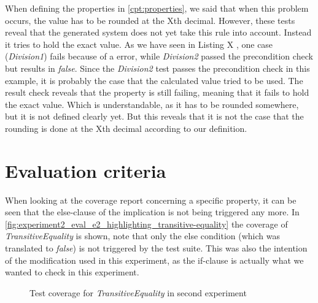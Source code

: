 When defining the properties in \autoref{cpt:properties}, we said that when this problem occurs, the value has to be rounded at the Xth  decimal. However, these tests reveal that the generated system does not yet take this rule into account. Instead it tries to hold the exact value. As we have seen in Listing X , one case (\textit{Division1}) fails because of a  error, while \textit{Division2} passed the precondition check but results in \textit{false}. Since the \textit{Division2} test passes the precondition check in this example, it is probably the case that the calculated value tried to be used. The result check reveals that the property is still failing, meaning that it fails to hold the exact value. Which is understandable, as it has to be rounded somewhere, but it is not defined clearly yet. But this reveals that it is not the case that the rounding is done at the Xth  decimal according to our definition.

\section{Evaluation criteria}
When looking at the coverage report concerning a specific property, it can be seen that the else-clause of the implication is not being triggered any more. In \autoref{fig:experiment2_eval_e2_highlighting_transitive-equality} the coverage of \textit{TransitiveEquality} is shown, note that only the else condition (which was translated to \textit{false}) is not triggered by the test suite. This was also the intention of the modification used in this experiment, as the if-clause is actually what we wanted to check in this experiment.
\FloatBarrier
\begin{figure}[!ht]
\caption{Test coverage for \textit{TransitiveEquality} in second experiment}
\label{fig:experiment2_eval_e2_highlighting_transitive-equality}
\centering
\end{figure}
\FloatBarrier

